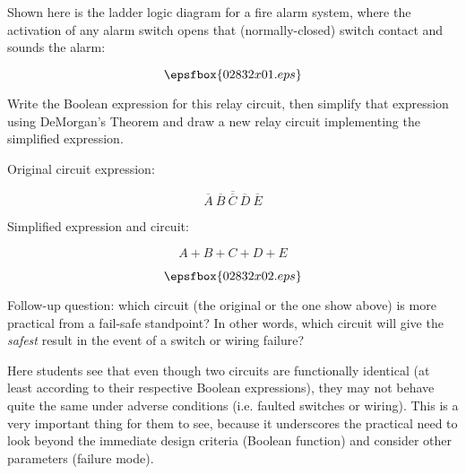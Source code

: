 

Shown here is the ladder logic diagram for a fire alarm system, where the activation of any alarm switch opens that (normally-closed) switch contact and sounds the alarm:

$$\epsfbox{02832x01.eps}$$

Write the Boolean expression for this relay circuit, then simplify that expression using DeMorgan's Theorem and draw a new relay circuit implementing the simplified expression.







Original circuit expression:

$$\overline{ \overline{A} \> \overline{B} \> \overline{C} \> \overline{D} \> \overline{E} }$$

Simplified expression and circuit:

$$A + B + C + D + E$$

$$\epsfbox{02832x02.eps}$$

\vskip 10pt

Follow-up question: which circuit (the original or the one show above) is more practical from a fail-safe standpoint?  In other words, which circuit will give the {\it safest} result in the event of a switch or wiring failure?







Here students see that even though two circuits are functionally identical (at least according to their respective Boolean expressions), they may not behave quite the same under adverse conditions (i.e. faulted switches or wiring).  This is a very important thing for them to see, because it underscores the practical need to look beyond the immediate design criteria (Boolean function) and consider other parameters (failure mode).




